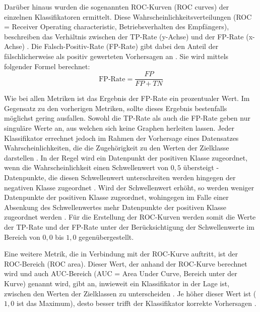 \label{roc-def}
Darüber hinaus wurden die sogenannten ROC-Kurven (ROC curves) der einzelnen Klassifikatoren ermittelt. Diese Wahrscheinlichkeitsverteilungen (ROC = Receiver Operating characteristic, Betriebsverhalten des Empfängers), beschreiben das Verhältnis zwischen der TP-Rate (y-Achse) und der FP-Rate (x-Achse) \cite{Sammut2017,Narkhede2018}. Die Falsch-Positiv-Rate (FP-Rate) gibt dabei den Anteil der fälschlicherweise als positiv gewerteten Vorhersagen an \cite{Alpaydin2010}. Sie wird mittels folgender Formel berechnet:
\\\[\text{FP-Rate} = \frac{FP}{FP+TN}\]

Wie bei allen Metriken ist das Ergebnis der FP-Rate ein prozentualer Wert. Im Gegensatz zu den vorherigen Metriken, sollte dieses Ergebnis bestenfalls möglichst gering ausfallen. Sowohl die TP-Rate als auch die FP-Rate geben nur singuläre Werte an, aus welchen sich keine Graphen herleiten lassen. Jeder Klassifikator errechnet jedoch im Rahmen der Vorhersage eines Datensatzes Wahrscheinlichkeiten, die die Zugehörigkeit zu den Werten der Zielklasse darstellen \cite{KNIMETV2019}. In der Regel wird ein Datenpunkt der positiven Klasse zugeordnet, wenn die Wahrscheinlichkeit einen Schwellenwert von $0,5$ übersteigt - Datenpunkte, die diesen Schwellenwert unterschreiten werden hingegen der negativen Klasse zugeordnet \cite{KNIMETV2019}. Wird der Schwellenwert erhöht, so werden weniger Datenpunkte der positiven Klasse zugeordnet, wohingegen im Falle einer Absenkung des Schwellenwertes mehr Datenpunkte der positiven Klasse zugeordnet werden \cite{KNIMETV2019}. Für die Erstellung der ROC-Kurven werden somit die Werte der TP-Rate und der FP-Rate unter der Berücksichtigung der Schwellenwerte im Bereich von $0,0$ bis $1,0$ gegenübergestellt.

Eine weitere Metrik, die in Verbindung mit der ROC-Kurve auftritt, ist der ROC-Bereich (ROC area). Dieser Wert, der anhand der ROC-Kurve berechnet wird und auch AUC-Bereich (AUC = Area Under Curve, Bereich unter der Kurve) genannt wird, gibt an, inwieweit ein Klassifikator in der Lage ist, zwischen den Werten der Zielklassen zu unterscheiden \cite{Narkhede2018}. Je höher dieser Wert ist ($1,0$ ist das Maximum), desto besser trifft der Klassifikator korrekte Vorhersagen \cite{Narkhede2018}.

